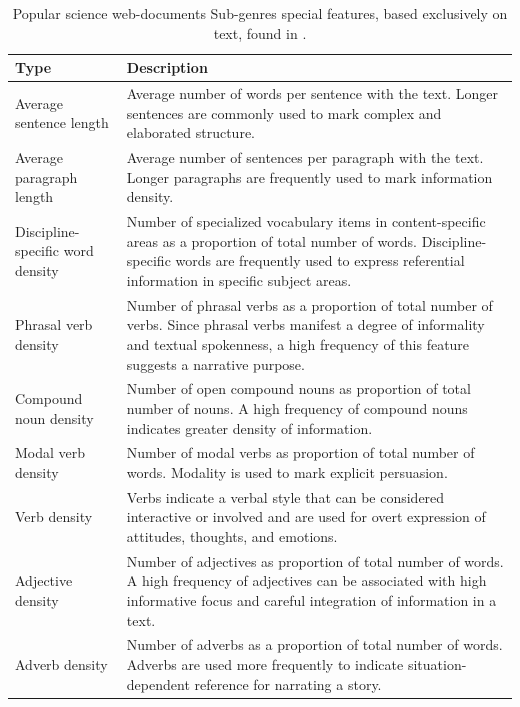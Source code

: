 \begin{table}[t]
	\center
	\caption {Popular science web-documents Sub-genres special features, based exclusively on text, found in \parencite{lieungnapar2017genre}.}\label{chap:relevant_work:tbl:pop_science_features}
	\begin{tabular}{p{2cm}p{12cm}}
		\hline
		Type & Description \\
		\hline
		Average sentence length & Average number of words per sentence with the text. Longer sentences are commonly used to mark complex and elaborated structure. \\
        \hline
        Average paragraph length & Average number of sentences per paragraph with the text. Longer paragraphs are frequently used to mark information density. \\
        \hline
        Discipline-specific word density & Number of specialized vocabulary items in content-specific areas as a proportion of total number of words. Discipline-specific words are frequently used to express referential information in specific subject areas. \\
        \hline
        Phrasal verb density & Number of phrasal verbs as a proportion of total number of verbs. Since phrasal verbs manifest a degree of informality and textual spokenness, a high frequency of this feature suggests a narrative purpose. \\
        \hline
        Compound noun density & Number of open compound nouns as proportion of total number of nouns. A high frequency of compound nouns indicates greater density of information. \\
        \hline
        Modal verb density & Number of modal verbs as proportion of total number of words. Modality is used to mark explicit persuasion.  \\
        \hline
        Verb density &  Verbs indicate a verbal style that can be considered interactive or involved and are used for overt expression of attitudes, thoughts, and emotions. \\
        \hline
        Adjective density & Number of adjectives as proportion of total number of words. A high frequency of adjectives can be associated with high informative focus and careful integration of information in a text. \\
        \hline
        Adverb density & Number of adverbs as a proportion of total number of words. Adverbs are used more frequently to indicate situation-dependent reference for narrating a story. \\

\end{tabular}
\end{table}
